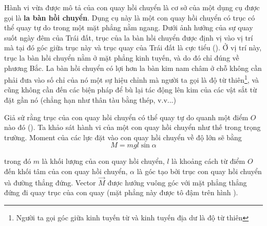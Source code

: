 Hành vi vừa được mô tả của con quay hồi chuyển là cơ sở của một dụng cụ được gọi là \textbf{la bàn hồi chuyển}. Dụng cụ này là một con quay hồi chuyển có trục có thể quay tự do trong một mặt phẳng nằm ngang. Dưới ảnh hưởng của sự quay suốt ngày đêm của Trái đất, trục của la bàn hồi chuyển được định vị vào vị trí mà tại đó góc giữa trục này và trục quay của Trái đất là cực tiểu (). Ở vị trí này, trục la bàn hồi chuyển nằm ở mặt phẳng kinh tuyến, và do đó chỉ đúng về phương Bắc. La bàn hồi chuyển có lợi hơn la bàn kim nam châm ở chỗ không cần phải đưa vào số chỉ của nó một sự hiệu chỉnh mà người ta gọi là độ từ thiên\footnote{Người ta gọi góc giữa kinh tuyến từ và kinh tuyến địa dư là độ từ thiên}, và cũng không cần đến các biện pháp để bù lại tác động lên kim của các vật sắt từ đặt gần nó (chẳng hạn như thân tàu bằng thép, v.v...)

Giả sử rằng trục của con quay hồi chuyển có thể quay tự do quanh một điểm $O$ nào đó (). Ta khảo sát hành vi của một con quay hồi chuyển như thế trong trọng trường. Moment của các lực đặt vào con quay hồi chuyển về độ lớn sẽ bằng
\begin{equation}\label{eq:5_71}
	M = mgl\sin\alpha
\end{equation}

\noindent
trong đó $m$ là khối lượng của con quay hồi chuyển, $l$ là khoảng cách từ điểm $O$ đến khối tâm của con quay hồi chuyển, $\alpha$ là góc tạo bởi trục con quay hồi chuyển và đường thẳng đứng. Vector $\vec{M}$ được hướng vuông góc với mặt phẳng thẳng đứng đi quay trục của con quay (mặt phẳng này được tô đậm trên hình ).

